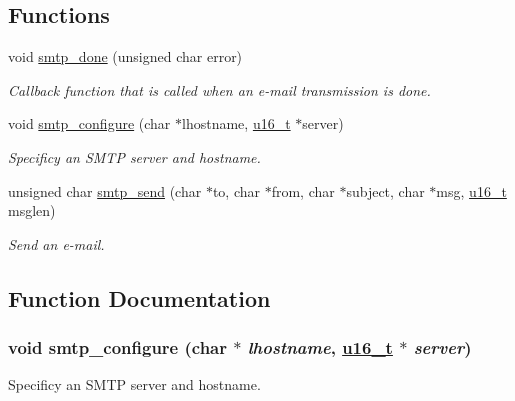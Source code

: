 \subsection*{Functions}
\begin{CompactItemize}
\item 
void \hyperlink{a00080_gb1fc692a2700b7a51517724364683f67}{smtp\_\-done} (unsigned char error)
\begin{CompactList}\small\item\em Callback function that is called when an e-mail transmission is done. \item\end{CompactList}\item 
void \hyperlink{a00080_gb190336472b91d4bbfa1eadaa54151e2}{smtp\_\-configure} (char $\ast$lhostname, \hyperlink{a00070_gfc6499c1f28697aa3bfc2804d496fd11}{u16\_\-t} $\ast$server)
\begin{CompactList}\small\item\em Specificy an SMTP server and hostname. \item\end{CompactList}\item 
unsigned char \hyperlink{a00080_g86f84869cd17114c9837b5ca4618ee21}{smtp\_\-send} (char $\ast$to, char $\ast$from, char $\ast$subject, char $\ast$msg, \hyperlink{a00070_gfc6499c1f28697aa3bfc2804d496fd11}{u16\_\-t} msglen)
\begin{CompactList}\small\item\em Send an e-mail. \item\end{CompactList}\end{CompactItemize}


\subsection{Function Documentation}
\hypertarget{a00080_gb190336472b91d4bbfa1eadaa54151e2}{
\subsubsection[smtp\_\-configure]{\setlength{\rightskip}{0pt plus 5cm}void smtp\_\-configure (char $\ast$ {\em lhostname}, \hyperlink{a00070_gfc6499c1f28697aa3bfc2804d496fd11}{u16\_\-t} $\ast$ {\em server})}}
\label{a00080_gb190336472b91d4bbfa1eadaa54151e2}


Specificy an SMTP server and hostname. 

